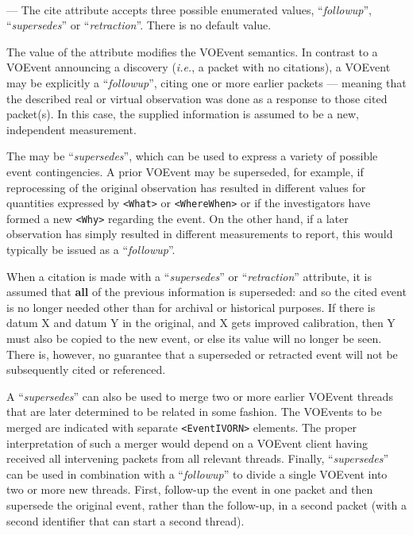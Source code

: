 \documentclass[11pt,a4paper]{ivoa}
\begin{document}
\paragraph{}\label{sec:3.7.1.1} --- The {cite} attribute accepts three
possible enumerated values, ``\emph{followup}'', ``\emph{supersedes}'' or
``\emph{retraction}''. There is no default value.

The value of the  attribute modifies the VOEvent semantics. In
contrast to a VOEvent announcing a discovery (\emph{i.e.}, a packet with no
citations), a VOEvent may be explicitly a ``\emph{followup}'', citing one or
more earlier packets --- meaning that the described real or virtual observation
was done as a response to those cited packet(s). In this case, the supplied
information is assumed to be a new, independent measurement.

The  may be ``\emph{supersedes}'', which can be used to express a
variety of possible event contingencies. A prior VOEvent may be superseded, for
example, if reprocessing of the original observation has resulted in different
values for quantities expressed by \verb|<What>| or \verb|<WhereWhen>| or if the
investigators have formed a new \verb|<Why>| regarding the event. On the other
hand, if a later observation has simply resulted in different measurements to
report, this would typically be issued as a ``\emph{followup}''.

When a citation is made with a ``\emph{supersedes}'' or ``\emph{retraction}''
attribute, it is assumed that \textbf{all} of the previous information is
superseded: and so the cited event is no longer needed other than for archival
or historical purposes. If there is datum X and datum Y in the original, and X
gets improved calibration, then Y must also be copied to the new event, or else
its value will no longer be seen. There is, however, no guarantee that a
superseded or retracted event will not be subsequently cited or referenced.

A ``\emph{supersedes}''  can also be used to merge two or more earlier
VOEvent threads that are later determined to be related in some fashion. The
VOEvents to be merged are indicated with separate \verb|<EventIVORN>| elements.
The proper interpretation of such a merger would depend on a VOEvent client
having received all intervening packets from all relevant threads. Finally,
``\emph{supersedes}'' can be used in combination with a ``\emph{followup}'' to
divide a single VOEvent into two or more new threads. First, follow-up the event
in one packet and then supersede the original event, rather than the follow-up,
in a second packet (with a second identifier that can start a second thread).
\end{document}
